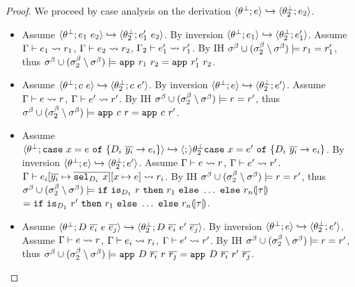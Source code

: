 \begin{proof}
We proceed by case analysis on the derivation 
$\langle {\theta_{}^\perp}; e\rangle\hookrightarrow\langle {\theta_{2}^\perp}; e_2\rangle$.
\begin{itemize}
\item 
Assume
	$\track{\tsub{}}{\refa_1\ \refa_2}\hookrightarrow\track{\tsub{2}}{\refa_1'\ \refa_2}$. 
By inversion 
	$\langle {\theta_{}^\perp}; e_1\rangle\hookrightarrow\langle {\theta_{2}^\perp}; e_1'\rangle$.
Assume
  $ \Gamma\vdash e_1 \rightsquigarrow r_1 $, 	
  $ \Gamma\vdash e_2 \rightsquigarrow r_2 $, 	
  $ \Gamma_2\vdash e_1' \rightsquigarrow r_1' $.  	
By IH 
  $\sigma^\beta \cup (\sigma^\beta_2 \setminus \sigma^\beta)
    \models r_1 = r_1'$, 
thus  
  $\sigma^\beta \cup (\sigma^\beta_2 \setminus \sigma^\beta)
    \models \texttt{app}^{}_{}\ {r_1}\ {r_2} = \texttt{app}^{}_{}\ {r_1'}\ {r_2}$. 
    
\item 
Assume
	$\track{\tsub{}}{c\ \refa}\hookrightarrow\track{\tsub{2}}{c\ \refa'}$. 
By inversion 
	$\langle {\theta_{}^\perp}; e\rangle\hookrightarrow\langle {\theta_{2}^\perp}; e'\rangle$.
Assume
  $ \Gamma\vdash e \rightsquigarrow r $,	
  $ \Gamma\vdash e' \rightsquigarrow r' $.  	
By IH 
  $\sigma^\beta \cup (\sigma^\beta_2 \setminus \sigma^\beta)
    \models r = r'$, 
thus  
  $\sigma^\beta \cup (\sigma^\beta_2 \setminus \sigma^\beta)
    \models \texttt{app}^{}_{}\ {c}\ {r} = \texttt{app}^{}_{}\ {c}\ {r'}$. 

\item 
Assume
	$\track{\tsub{}}{\ecase{x}{\refa}{\dc_i}{\overline{y_i}}{e_i}}
	  \hookrightarrow\track
	  {\tsub{2}}{\ecase{x}{\refa'}{\dc_i}{\overline{y_i}}{e_i}}$. 
By inversion 
	$\langle {\theta_{}^\perp}; e\rangle\hookrightarrow\langle {\theta_{2}^\perp}; e'\rangle$.
Assume
  $ \Gamma\vdash e \rightsquigarrow r $,	
  $ \Gamma\vdash e' \rightsquigarrow r' $.  	
  $\tologicshort{\env}{e_i\subst{\overline{y_i}}{\overline{\selector{\dc_i}{}\ x}}\subst{x}{e}}{\typ}{\pred_i}{\embed{\typ}}{\smtenv}{\axioms_i}$.
By IH 
  $\sigma^\beta \cup (\sigma^\beta_2 \setminus \sigma^\beta)
    \models r = r'$, 
thus  
  $\bmodel \cup (\bmodel_2 \setminus \bmodel)
   \models
	 {\eif{\checkdc{\dc_1}\ \pred}{\pred_1}{\ldots} \ \mathtt{else}\ \pred_n}{\embed{\typ}}
 $\\ $=
	 {\eif{\checkdc{\dc_1}\ \pred'}{\pred_1}{\ldots} \ \mathtt{else}\ \pred_n}{\embed{\typ}}
  $.	 

\item 
Assume
	$\track{\tsub{}}{D\ \overline{\refa_i}\ \refa\ \overline{\refa_j}}
	\hookrightarrow\track{\tsub{2}}{D\ \overline{\refa_i}\ \refa'\ \overline{\refa_j}}$. 
By inversion 
	$\langle {\theta_{}^\perp}; e\rangle\hookrightarrow\langle {\theta_{2}^\perp}; e'\rangle$.
Assume
  $ \Gamma\vdash e \rightsquigarrow r $,	
  $ \Gamma\vdash e_i \rightsquigarrow r_i $,	
  $ \Gamma\vdash e' \rightsquigarrow r' $.  	
By IH 
  $\sigma^\beta \cup (\sigma^\beta_2 \setminus \sigma^\beta)
    \models r = r'$, 
thus  
  $\bmodel \cup (\bmodel_2 \setminus \bmodel)
    \models \smapp{D}{\overline{\pred_i}\ \pred\ \overline{\pred_j}} 
          = \smapp{D}{\overline{\pred_i}\ \pred'\ \overline{\pred_j}}$. 


\end{itemize}
\end{proof}
